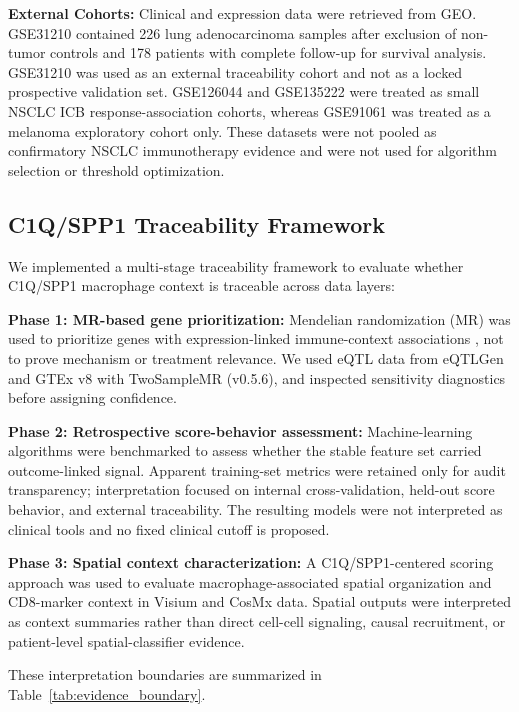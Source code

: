 \documentclass[pdflatex,sn-mathphys-num,referee,lineno]{sn-jnl}
\theoremstyle{thmstyleone}%
\theoremstyle{thmstyletwo}%
\theoremstyle{thmstylethree}%
\begin{document}
\textbf{External Cohorts:} Clinical and expression data were retrieved from GEO. GSE31210 contained 226 lung adenocarcinoma samples after exclusion of non-tumor controls and 178 patients with complete follow-up for survival analysis. GSE31210 was used as an external traceability cohort and not as a locked prospective validation set. GSE126044 and GSE135222 were treated as small NSCLC ICB response-association cohorts, whereas GSE91061 was treated as a melanoma exploratory cohort only. These datasets were not pooled as confirmatory NSCLC immunotherapy evidence and were not used for algorithm selection or threshold optimization.

\subsection{C1Q/SPP1 Traceability Framework}\label{subsec:framework}

We implemented a multi-stage traceability framework to evaluate whether C1Q/SPP1 macrophage context is traceable across data layers:

\textbf{Phase 1: MR-based gene prioritization:} Mendelian randomization (MR) was used to prioritize genes with expression-linked immune-context associations \cite{daveysmithMendelianRandomizationCan2003}, not to prove mechanism or treatment relevance. We used eQTL data from eQTLGen \cite{vosaLargescaleCisTranseQTL2021} and GTEx v8 with TwoSampleMR (v0.5.6), and inspected sensitivity diagnostics before assigning confidence.

\textbf{Phase 2: Retrospective score-behavior assessment:} Machine-learning algorithms were benchmarked to assess whether the stable feature set carried outcome-linked signal. Apparent training-set metrics were retained only for audit transparency; interpretation focused on internal cross-validation, held-out score behavior, and external traceability. The resulting models were not interpreted as clinical tools and no fixed clinical cutoff is proposed.

\textbf{Phase 3: Spatial context characterization:} A C1Q/SPP1-centered scoring approach was used to evaluate macrophage-associated spatial organization and CD8-marker context in Visium and CosMx data. Spatial outputs were interpreted as context summaries rather than direct cell-cell signaling, causal recruitment, or patient-level spatial-classifier evidence.

These interpretation boundaries are summarized in Table~\ref{tab:evidence_boundary}.
\end{document}
